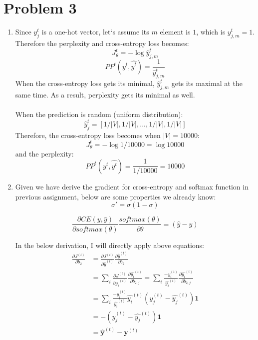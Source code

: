 \documentclass[10pt]{article}
\begin{document}
\section*{Problem 3}
\begin{enumerate}[label=(\alph*)]
\item
Since $y_j^{t}$ is a one-hot vector, let`s assume its $m$ element is $1$, which is $y_{j,m}^{t} = 1$.
Therefore the perplexity and cross-entropy loss becomes:
\begin{equation*}
	J_{\theta}^{t} = - \log{\hat{y}_{j,m}^{t}}
\end{equation*}
\begin{equation*}
	PP^{t}(y^t, \hat{y^t}) = \frac{1}{\hat{y}_{j,m}^{t}}
\end{equation*}
When the cross-entropy loss gets its minimal, $\hat{y}_{j,m}^{t}$ gets its maximal at the same time.
As a result, perplexity gets its minimal as well.\\
\\
When the prediction is random (uniform distribution):
\begin{equation}
	\hat{y}_{j}^{t} = [1/|V|, 1/|V|, ..., 1/|V|, 1/|V|]
\end{equation}
Therefore, the cross-entropy loss becomes when $|V|=10000$:
\begin{equation}
	J_{\theta}^{t} = -\log{1/10000} = \log{10000}
\end{equation}
and the perplexity:
\begin{equation}
	PP^{t}(y^t, \hat{y^t}) = \frac{1}{1/10000} = 10000
\end{equation}

\item
Given we have derive the gradient for cross-entropy and softmax function in previous assignment, below are some properties we already know:
\begin{equation}
	\sigma' = \sigma(1-\sigma)
\end{equation}

\begin{equation}
	\frac{\partial CE(y, \hat{y})}{\partial softmax(\theta)}\frac{softmax(\theta)}{\partial \theta} = (\hat{y} - y)
\end{equation}

In the below derivation, I will directly apply above equations:
\begin{equation}
\begin{aligned}
	\frac{\partial J^{(t)}}{\partial b_2} & = \frac{\partial J^{(t)}}{\partial \hat{y}^{(t)}}
	\frac{\partial \hat{y}^{(t)}}{\partial b_2}\\
	& = \sum_i\frac{\partial J^{(t)}}{\partial \hat{y_i}^{(t)}}
	\frac{\partial \hat{y_i}^{(t)}}{\partial b_{2,j}}
	= \sum_i\frac{-y_i^{(t)}}{\hat{y_i}^{(t)}}
	\frac{\partial \hat{y_i}^{(t)}}{\partial b_{2,j}}\\
	& = \sum_i\frac{-y_i^{(t)}}{\hat{y_i}^{(t)}}\hat{y_i}^{(t)}(y_j^{(t)}-\hat{y_j}^{(t)})\mathbf{1}\\
	& = -(y_j^{(t)}-\hat{y_j}^{(t)})\mathbf{1}\\
	& = \hat{\mathbf{y}}^{(t)} - \mathbf{y}^{(t)}
\end{aligned}
\end{equation}


\end{enumerate}
\end{document}
